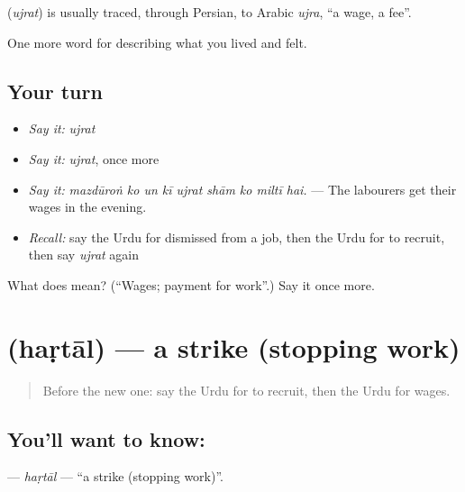 \begin{cousinweb}
\textbf{} (\emph{ujrat}) is usually traced, through Persian, to Arabic \emph{ujra}, \textquotedblleft{}a wage, a fee\textquotedblright{}.
\end{cousinweb}

\begin{grammarlens}[title={What you've built}]
One more word for describing what you lived and felt.
\end{grammarlens}

\subsection*{Your turn}
\begin{itemize}
\raggedright
  \item \emph{Say it:} \emph{ujrat}
  \item \emph{Say it:} \emph{ujrat}, once more
  \item \emph{Say it:} \emph{mazdūroṅ ko un kī ujrat shām ko miltī hai.} — The labourers get their wages in the evening.
  \item \emph{Recall:} say the Urdu for dismissed from a job, then the Urdu for to recruit, then say \emph{ujrat} again
\end{itemize}

\begin{tcolorbox}[breakable,colback=teal!4,colframe=teal!35!black,title={Before you move on}]
What does  mean? (\textquotedblleft{}Wages; payment for work\textquotedblright{}.) Say it once more.
\end{tcolorbox}
\section[\texorpdfstring{\ur{ہڑتال} (haṛtāl)}{ہڑتال (haṛtāl)}]{ (haṛtāl) — a strike (stopping work)}

\label{lesson:UR-C495-hartal}



\begin{quote}
Before the new one: say the Urdu for to recruit, then the Urdu for wages.
\end{quote}

\subsection*{You'll want to know: }
\textbf{} — \emph{haṛtāl} — \textquotedblleft{}a strike (stopping work)\textquotedblright{}.

